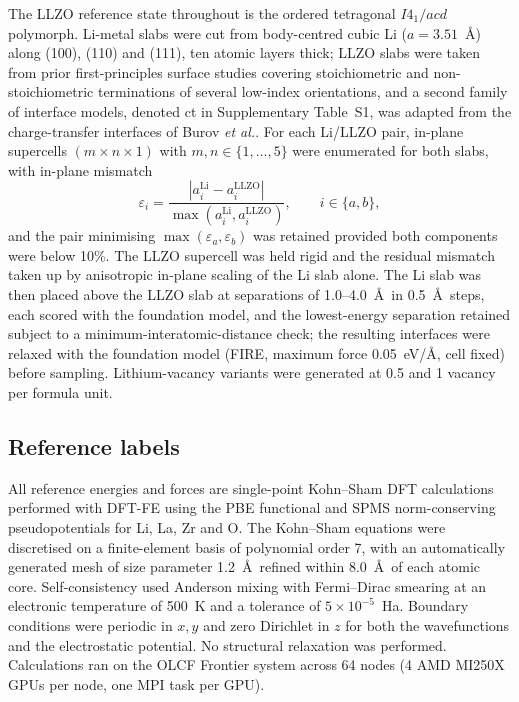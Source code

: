 \documentclass[11pt]{article}
\begin{document}
The LLZO reference state throughout is the ordered tetragonal $I4_1/acd$
polymorph\citep{Awaka2009}. Li-metal slabs were cut from body-centred cubic Li
($a=3.51$~\AA) along (100), (110) and (111), ten atomic layers thick; LLZO
slabs were taken from prior first-principles surface studies covering
stoichiometric and non-stoichiometric terminations of several low-index
orientations\citep{Canepa2018}, and a second family of interface models, denoted
ct in Supplementary Table~S1, was adapted from the charge-transfer interfaces of
Burov \emph{et al.}\citep{Burov2024}. %
For each Li/LLZO pair, in-plane supercells $(m\times n\times1)$ with
$m,n\in\{1,\dots,5\}$ were enumerated for both slabs, with in-plane mismatch
\begin{equation}
\varepsilon_i = \frac{|a_i^{\mathrm{Li}}-a_i^{\mathrm{LLZO}}|}
{\max\!\left(a_i^{\mathrm{Li}},a_i^{\mathrm{LLZO}}\right)},\qquad i\in\{a,b\},
\end{equation}
and the pair minimising $\max(\varepsilon_a,\varepsilon_b)$ was retained provided
both components were below 10\%. The LLZO supercell was held rigid and the
residual mismatch taken up by anisotropic in-plane scaling of the Li slab alone.
The Li slab was then placed above the LLZO slab at separations of 1.0--4.0~\AA\
in 0.5~\AA\ steps, each scored with the foundation model, and the lowest-energy
separation retained subject to a minimum-interatomic-distance check; the
resulting interfaces were relaxed with the foundation model (FIRE, maximum force
0.05~eV/\AA, cell fixed) before sampling. %
Lithium-vacancy variants were generated at 0.5 and 1 vacancy per formula unit.

\subsection{Reference labels}
All reference energies and forces are single-point Kohn--Sham DFT calculations
performed with DFT-FE\citep{dftfe,Das2022} using the PBE
functional\citep{pbe1996} and SPMS norm-conserving
pseudopotentials\citep{spms} for Li, La, Zr and O. The Kohn--Sham equations were
discretised on a finite-element basis of polynomial order 7, with an
automatically generated mesh of size parameter 1.2~\AA\ refined within 8.0~\AA\
of each atomic core. Self-consistency used Anderson mixing with Fermi--Dirac
smearing at an electronic temperature of 500~K and a tolerance of
$5\times10^{-5}$~Ha. Boundary conditions were periodic in $x,y$ and zero
Dirichlet in $z$ for both the wavefunctions and the electrostatic potential. No
structural relaxation was performed. Calculations ran on the OLCF Frontier
system across 64 nodes (4 AMD MI250X GPUs per node, one MPI task per GPU).
\end{document}
